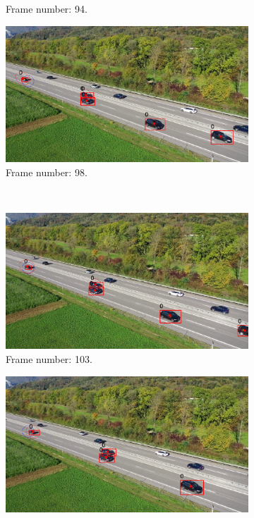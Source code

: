 \begin{figure}[H]
\begin{subfigure}{0.48\textwidth}
        \caption{Frame number: 94.}
        \label{fig:E1-V2-S3:03}
    \end{subfigure}
    \begin{subfigure}{0.48\textwidth}
        \centering
        \includegraphics[width=\linewidth]{../../../experiments/E1/V2/DINO/98}
        \caption{Frame number: 98.}
        \label{fig:E1-V2-S3:04}
    \end{subfigure}
    \\
    \begin{subfigure}{0.48\textwidth}
        \centering
        \includegraphics[width=\linewidth]{../../../experiments/E1/V2/DINO/103}
        \caption{Frame number: 103.}
        \label{fig:E1-V2-S3:05}
    \end{subfigure}
    \begin{subfigure}{0.48\textwidth}
        \centering
        \includegraphics[width=\linewidth]{../../../experiments/E1/V2/DINO/109}

\end{subfigure}
\end{figure}
